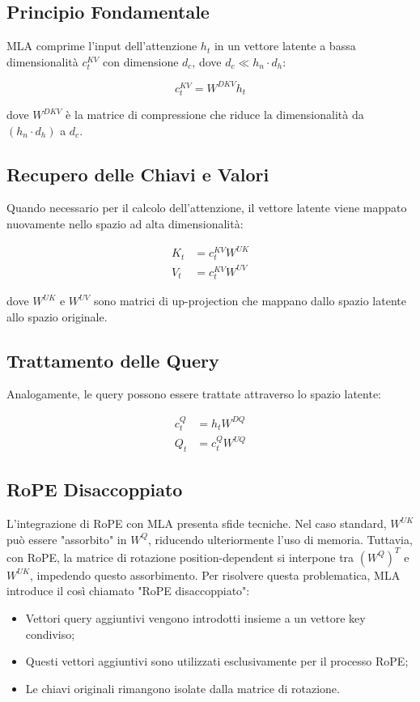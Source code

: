 \subsection{Principio Fondamentale}
MLA comprime l'input dell'attenzione $h_t$ in un vettore latente a bassa dimensionalità $c_t^{KV}$ con dimensione $d_c$, dove $d_c \ll h_n \cdot d_h$:

\[
    c_t^{KV} = W^{DKV}h_t
\]

dove $W^{DKV}$ è la matrice di compressione che riduce la dimensionalità da $(h_n \cdot d_h)$ a $d_c$.

\subsection{Recupero delle Chiavi e Valori}
Quando necessario per il calcolo dell'attenzione, il vettore latente viene mappato nuovamente nello spazio ad alta dimensionalità:

\begin{align*}
    K_t &= c_t^{KV} W^{UK} \\
    V_t &= c_t^{KV} W^{UV}
\end{align*}

dove $W^{UK}$ e $W^{UV}$ sono matrici di up-projection che mappano dallo spazio latente allo spazio originale.

\subsection{Trattamento delle Query}
Analogamente, le query possono essere trattate attraverso lo spazio latente:

\begin{align*}
    c_t^Q &= h_t W^{DQ} \\
    Q_t &= c_t^Q W^{UQ}
\end{align*}

\subsection{RoPE Disaccoppiato}
L'integrazione di RoPE con MLA presenta sfide tecniche. Nel caso standard, $W^{UK}$ può essere "assorbito" in $W^Q$, riducendo ulteriormente l'uso di memoria. Tuttavia, con RoPE, la matrice di rotazione position-dependent si interpone tra $(W^Q)^T$  e $W^{UK}$, impedendo questo assorbimento. Per risolvere questa problematica, MLA introduce il così chiamato "RoPE disaccoppiato":
\begin{itemize}
    \item Vettori query aggiuntivi vengono introdotti insieme a un vettore key condiviso;
    \item Questi vettori aggiuntivi sono utilizzati esclusivamente per il processo RoPE;
    \item Le chiavi originali rimangono isolate dalla matrice di rotazione.
\end{itemize}

